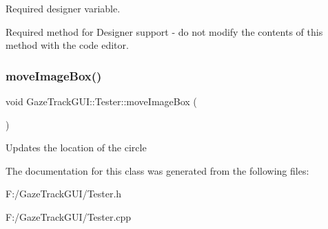 Required designer variable. 

Required method for Designer support -\/ do not modify the contents of this method with the code editor. \mbox{\label{class_gaze_track_g_u_i_1_1_tester_a5d43b09e8e58ab48a5299fabbdb075a6}} 
\subsubsection{\texorpdfstring{move\+Image\+Box()}{moveImageBox()}}
{\footnotesize\ttfamily void Gaze\+Track\+G\+U\+I\+::\+Tester\+::move\+Image\+Box (\begin{DoxyParamCaption}{ }\end{DoxyParamCaption})\hspace{0.3cm}{\ttfamily [private]}}

Updates the location of the circle 

The documentation for this class was generated from the following files\+:\begin{DoxyCompactItemize}
\item 
F\+:/\+Gaze\+Track\+G\+U\+I/Tester.\+h\item 
F\+:/\+Gaze\+Track\+G\+U\+I/Tester.\+cpp\end{DoxyCompactItemize}
